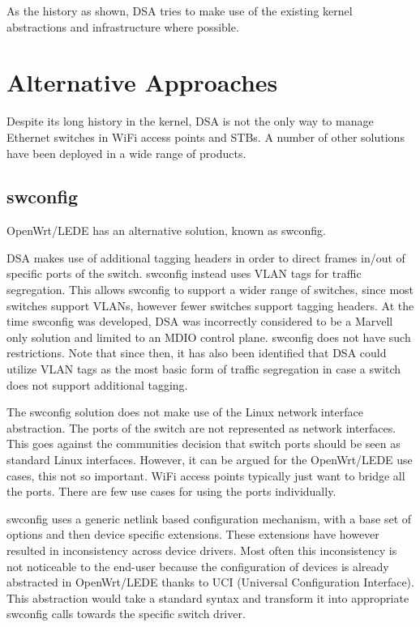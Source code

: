 \documentclass[letterpaper]{article}
\begin{document}
As the history as shown, DSA tries to make use of the existing kernel
abstractions and infrastructure where possible.

\section{Alternative Approaches}

Despite its long history in the kernel, DSA is not the only way to
manage Ethernet switches in WiFi access points and STBs. A number of
other solutions have been deployed in a wide range of products.

\subsection{swconfig}

OpenWrt/LEDE has an alternative solution, known as swconfig.

DSA makes use of additional tagging headers in order to direct frames
in/out of specific ports of the switch. swconfig instead uses VLAN
tags for traffic segregation. This allows swconfig to support a wider
range of switches, since most switches support VLANs, however fewer
switches support tagging headers. At the time swconfig was developed,
DSA was incorrectly considered to be a Marvell only solution and
limited to an MDIO control plane. swconfig does not have such
restrictions. Note that since then, it has also been identified that
DSA could utilize VLAN tags as the most basic form of traffic
segregation in case a switch does not support additional tagging.

The swconfig solution does not make use of the Linux network interface
abstraction. The ports of the switch are not represented as network
interfaces. This goes against the communities decision that switch
ports should be seen as standard Linux interfaces. However, it can be
argued for the OpenWrt/LEDE use cases, this not so important. WiFi
access points typically just want to bridge all the ports. There are
few use cases for using the ports individually.

swconfig uses a generic netlink based configuration mechanism, with a
base set of options and then device specific extensions. These
extensions have however resulted in inconsistency across device
drivers. Most often this inconsistency is not noticeable to the
end-user because the configuration of devices is already abstracted in
OpenWrt/LEDE thanks to UCI (Universal Configuration Interface). This
abstraction would take a standard syntax and transform it into
appropriate swconfig calls towards the specific switch driver.
\end{document}
